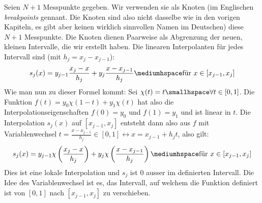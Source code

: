 Seien $N + 1$ Messpunkte gegeben. Wir verwenden sie als Knoten 
(im Englischen \textit{breakpoints} gennant. Die Knoten sind also nicht dasselbe wie in den vorigen Kapiteln, es gibt aber keinen wirklich sinnvollen Namen im Deutschen)
diese $N + 1$ Messpunkte. Die Knoten dienen Paarweise als Abgrenzung der neuen, kleinen Intervalle, die wir erstellt haben. 
Die linearen Interpolanten für jedes Intervall sind (mit $h_j = x_j - x_{j - 1}$):
\begin{align*}
    s_j(x) = y_{j - 1}\frac{x_j - x}{h_j} + y_j \frac{x - x_{j - 1}}{h_j} \mediumhspace \text{für } x \in [x_{j - 1}, x_j]
\end{align*}
Wie man nun zu dieser Formel kommt:
Sei $\chi(t) = t \smallhspace \forall t \in [0, 1]$. 
Die Funktion $f(t) = y_0 \chi(1 - t) + y_1 \chi(t)$ hat also die Interpolationseigenschaften $f(0) = y_0$ und $f(1) = y_1$ und ist linear in $t$.
Die Interpolation $s_j(x)$ auf $[x_{j - 1}, x_j]$ entsteht dann also aus $f$ mit Variablenwechsel $t = \frac{x - x_{j - 1}}{h_j} \in [0, 1] \leftrightarrow x = x_{j - 1} + h_j t$,
also gilt:
\begin{align*}
    s_j(x) = y_{j - 1} \chi \left( \frac{x_j - x}{h_j} \right) + y_j \chi \left( \frac{x - x_{j - 1}}{h_j} \right) \mediumhspace \text{für } x \in [x_{j - 1}, x_j]
\end{align*}
Dies ist eine lokale Interpolation und $s_j$ ist $0$ ausser im definierten Intervall. 
Die Idee des Variablenwechsel ist es, das Intervall, auf welchem die Funktion definiert ist von $[0, 1]$ nach $[x_{j - 1}, x_j]$ zu verschieben.

